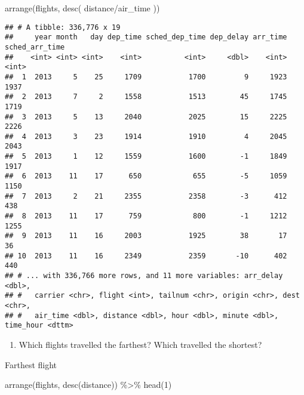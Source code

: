 \documentclass[
]{article}
\newenvironment{Shaded}{\begin{snugshade}}{\end{snugshade}}
\newcommand{\DecValTok}[1]{\textcolor[rgb]{0.00,0.00,0.81}{#1}}
\newcommand{\FunctionTok}[1]{\textcolor[rgb]{0.00,0.00,0.00}{#1}}
\newcommand{\NormalTok}[1]{#1}
\newcommand{\SpecialCharTok}[1]{\textcolor[rgb]{0.00,0.00,0.00}{#1}}
\providecommand{\tightlist}{%
  \setlength{\itemsep}{0pt}\setlength{\parskip}{0pt}}
\begin{document}
\begin{Shaded}
\begin{Highlighting}[]
\FunctionTok{arrange}\NormalTok{(flights, }\FunctionTok{desc}\NormalTok{( distance}\SpecialCharTok{/}\NormalTok{air\_time ))}
\end{Highlighting}
\end{Shaded}

\begin{verbatim}
## # A tibble: 336,776 x 19
##     year month   day dep_time sched_dep_time dep_delay arr_time sched_arr_time
##    <int> <int> <int>    <int>          <int>     <dbl>    <int>          <int>
##  1  2013     5    25     1709           1700         9     1923           1937
##  2  2013     7     2     1558           1513        45     1745           1719
##  3  2013     5    13     2040           2025        15     2225           2226
##  4  2013     3    23     1914           1910         4     2045           2043
##  5  2013     1    12     1559           1600        -1     1849           1917
##  6  2013    11    17      650            655        -5     1059           1150
##  7  2013     2    21     2355           2358        -3      412            438
##  8  2013    11    17      759            800        -1     1212           1255
##  9  2013    11    16     2003           1925        38       17             36
## 10  2013    11    16     2349           2359       -10      402            440
## # ... with 336,766 more rows, and 11 more variables: arr_delay <dbl>,
## #   carrier <chr>, flight <int>, tailnum <chr>, origin <chr>, dest <chr>,
## #   air_time <dbl>, distance <dbl>, hour <dbl>, minute <dbl>, time_hour <dttm>
\end{verbatim}

\begin{enumerate}
\def\labelenumi{\arabic{enumi}.}
\setcounter{enumi}{3}
\tightlist
\item
  Which flights travelled the farthest? Which travelled the shortest?
\end{enumerate}

Farthest flight

\begin{Shaded}
\begin{Highlighting}[]
\FunctionTok{arrange}\NormalTok{(flights, }\FunctionTok{desc}\NormalTok{(distance)) }\SpecialCharTok{\%\textgreater{}\%} \FunctionTok{head}\NormalTok{(}\DecValTok{1}\NormalTok{)}
\end{Highlighting}
\end{Shaded}
\end{document}
